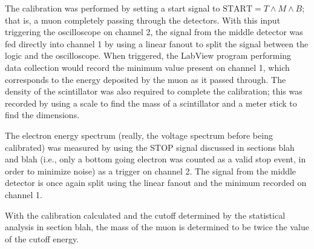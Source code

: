 The calibration was performed by setting a start signal to $\mathrm{START} = T \wedge M \wedge B$; that is, a muon completely passing through the detectors. With this input triggering the oscilloscope on channel 2, the signal from the middle detector was fed directly into channel 1 by using a linear fanout to split the signal between the logic and the oscilloscope. When triggered, the LabView program performing data collection would record the minimum value present on channel 1, which corresponds to the energy deposited by the muon as it passed through. The density of the scintillator was also required to complete the calibration; this was recorded by using a scale to find the mass of a scintillator and a meter stick to find the dimensions.

The electron energy spectrum (really, the voltage spectrum before being calibrated) was measured by using the STOP signal discussed in sections blah and blah (i.e., only a bottom going electron was counted as a valid stop event, in order to minimize noise) as a trigger on channel 2. The signal from the middle detector is once again split using the linear fanout and the minimum recorded on channel 1. 

With the calibration calculated and the cutoff determined by the statistical analysis in section blah, the mass of the muon is determined to be twice the value of the cutoff energy.